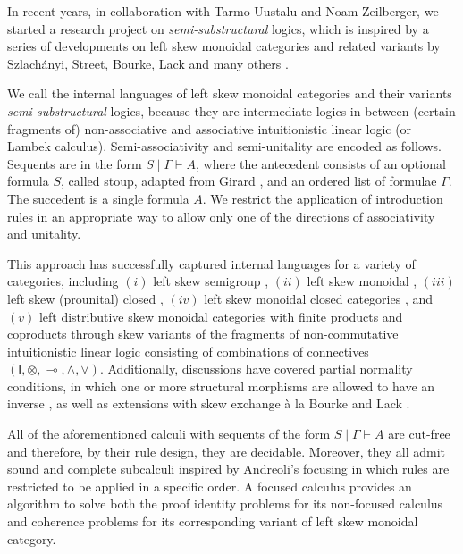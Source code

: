 \documentclass[a4paper,UKenglish,cleveref, autoref, thm-restate, anonymous]{lipics-v2021}
\newcommand{\GG}{\Gamma}
\newcommand{\vd}{\vdash}
\newcommand{\ot}{\otimes}
\newcommand{\lolli}{\multimap}
\newcommand{\I}{\mathsf{I}}
\begin{document}
In recent years, in collaboration with Tarmo Uustalu and Noam Zeilberger, we started a research project on \emph{semi-substructural} logics, which is inspired by a series of developments on left skew monoidal categories and related variants by Szlach{\'a}nyi, Street, Bourke, Lack and many others \cite{szlachanyi:skew-monoidal:2012,street:skew-closed:2013,lack:triangulations:2014,bourke:skew:2018,bourke:lack:braided:2020}.

We call the internal languages of left skew monoidal categories and their variants \emph{semi-substructural} logics, because they are intermediate logics in between (certain fragments of) non-associative and associative intuitionistic linear logic (or Lambek calculus).
Semi-associativity and semi-unitality are encoded as follows.
Sequents are in the form $S \mid \Gamma \vdash A$, where the antecedent consists of an optional formula $S$, called stoup, adapted from Girard \cite{girard:constructive:91}, and an ordered list of formulae $\Gamma$.
The succedent is a single formula $A$.
We restrict the application of introduction rules in an appropriate way to allow only one of the directions of associativity and unitality.

This approach has successfully captured internal languages for a variety of categories, including  $(i)$ left skew semigroup \cite{zeilberger:semiassociative:19}, $(ii)$ left skew monoidal \cite{uustalu:sequent:2021}, $(iii)$ left skew (prounital) closed \cite{uustalu:deductive:nodate}, $(iv)$ left skew monoidal closed categories \cite{UVW:protsn,veltri:multifocus:23}, and $(v)$ left distributive skew monoidal categories with finite products and coproducts \cite{VW:2023} through skew variants of the fragments of non-commutative intuitionistic linear logic consisting of combinations of connectives $(\I,\ot,\lolli,\land,\lor)$.
Additionally, discussions have covered partial normality conditions, in which one or more structural morphisms are allowed to have an inverse \cite{uustalu:proof:nodate}, as well as extensions with skew exchange à la Bourke and Lack \cite{veltri:coherence:2021,VW:2023}.

All of the aforementioned calculi with sequents of the form $S \mid \GG \vd A$ are cut-free and therefore, by their rule design, they are decidable.
Moreover, they all admit sound and complete subcalculi inspired by Andreoli's focusing \cite{andreoli:logic:1992} in which
rules are restricted to be applied in a specific order.
A focused calculus provides an algorithm to solve both the proof identity problems for its non-focused calculus and coherence problems for its corresponding variant of left skew monoidal category.
\end{document}
